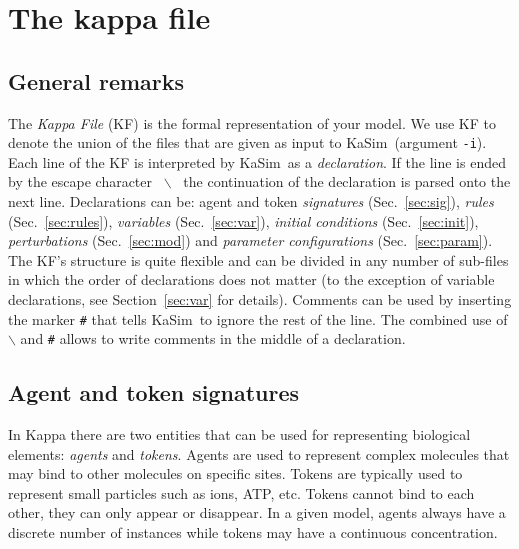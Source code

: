 \documentclass[11pt]{book}
\def\KaSim{\textsf{KaSim}}
\def\ttt#1{\texttt{#1}}
\def\bs{\backslash}
\def\imp#1{\emph{#1}\index{#1}}
\begin{document}
\chapter{The kappa file}\label{chap:kappa}

\section{General remarks}
The \emph{Kappa File} (KF) is the formal
representation of your model. We use KF to denote
the union of the files that are given as input to \KaSim~(argument
\ttt{-i}). Each line of the KF is interpreted by
\KaSim~as a \emph{declaration}. If the line is
ended by the escape character~{\textquotesingle}
\ttt{$\bs$}{\textquotesingle} ~the continuation of the
declaration is parsed onto the next
line. Declarations can be: agent and token \emph{signatures}
(Sec.~\ref{sec:sig}), \emph{rules} (Sec.~\ref{sec:rules}),
\emph{variables} (Sec.~\ref{sec:var}), \emph{initial
  conditions} (Sec.~\ref{sec:init}),
\emph{perturbations} (Sec.~\ref{sec:mod}) and
\emph{parameter configurations} (Sec.~\ref{sec:param}). The
KF's structure is quite flexible and can be divided
in any number of sub-files in which the order of
declarations does not matter (to the exception of
variable declarations, see Section~\ref{sec:var}
for details). Comments can be used by inserting the
marker \ttt{\#} that tells \KaSim~to ignore the rest of the line. The
combined use of \ttt{$\bs$} and \ttt{\#} allows to write comments in
the middle of a declaration.

\section{Agent and token signatures}\label{sec:sig}
%
In Kappa there are two entities that can be used for representing biological elements: \imp{agents} and \imp{tokens}.  Agents are used to represent complex molecules that may bind to other molecules on specific sites. Tokens are typically used to represent small particles such as ions, ATP, etc. Tokens cannot bind to each other, they can only appear or disappear. In a given model, agents always have a discrete number of instances while tokens may have a continuous concentration.
\end{document}

